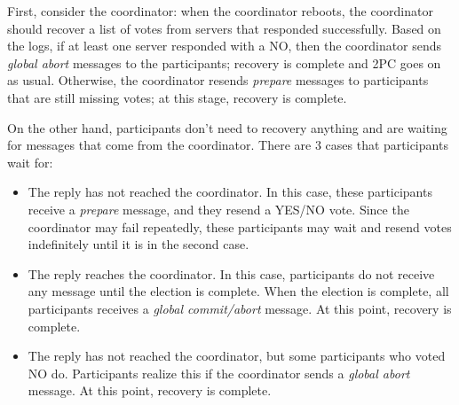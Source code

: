 First, consider the coordinator:
when the coordinator reboots, the coordinator should recover a list of votes from servers that responded successfully.
Based on the logs, if at least one server responded with a NO, then the coordinator sends \emph{global abort} messages to the participants; recovery is complete and 2PC goes on as usual.
Otherwise, the coordinator resends \emph{prepare} messages to participants that are still missing votes; at this stage, recovery is complete.

On the other hand, participants don't need to recovery anything and are waiting for messages that come from the coordinator.
There are 3 cases that participants wait for:
\begin{itemize}
\item
The reply has not reached the coordinator.
In this case, these participants receive a \emph{prepare} message, and they resend a YES/NO vote.
Since the coordinator may fail repeatedly, these participants may wait and resend votes indefinitely until it is in the second case.
\item
The reply reaches the coordinator.
In this case, participants do not receive any message until the election is complete.
When the election is complete, all participants receives a \emph{global commit/abort} message.
At this point, recovery is complete.
\item
The reply has not reached the coordinator, but some participants who voted NO do.
Participants realize this if the coordinator sends a \emph{global abort} message.
At this point, recovery is complete.
\end{itemize}
